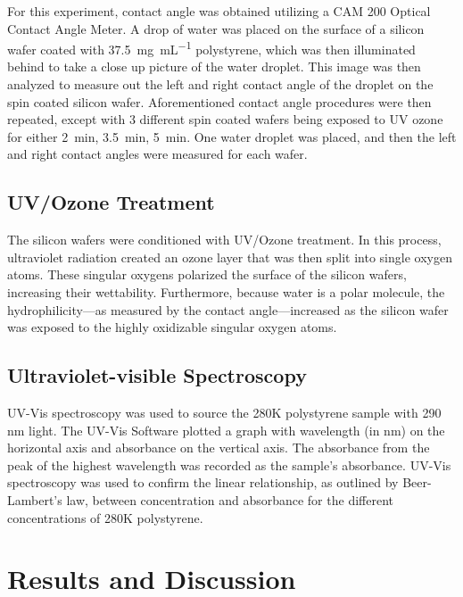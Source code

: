 \documentclass[twocolumn]{article}
\begin{document}
                For this experiment, contact angle was obtained utilizing a CAM 200 Optical Contact Angle Meter. A drop of water was placed on the surface of a silicon wafer coated with \qty{37.5}{\milli\gram\per\milli\liter} polystyrene, which was then illuminated behind to take a close up picture of the water droplet. This image was then analyzed to measure out the left and right contact angle of the droplet on the spin coated silicon wafer. Aforementioned contact angle procedures were then repeated, except with 3 different spin coated wafers being exposed to UV ozone for either \qty{2}{\minute}, \qty{3.5}{\minute}, \qty{5}{\minute}. One water droplet was placed, and then the left and right contact angles were measured for each wafer. 
            
            \subsection{UV/Ozone Treatment}
                The silicon wafers were conditioned with UV/Ozone treatment. In this process, ultraviolet radiation created an ozone layer that was then split into single oxygen atoms. These singular oxygens polarized the surface of the silicon wafers, increasing their wettability. Furthermore, because water is a polar molecule, the hydrophilicity---as measured by the contact angle---increased as the silicon wafer was exposed to the highly oxidizable singular oxygen atoms. 

            \subsection{Ultraviolet-visible Spectroscopy}
                UV-Vis spectroscopy was used to source the 280K polystyrene sample with 290 nm light. The UV-Vis Software plotted a graph with wavelength (in nm) on the horizontal axis and absorbance on the vertical axis. The absorbance from the peak of the highest wavelength was recorded as the sample's absorbance. UV-Vis spectroscopy was used to confirm the linear relationship, as outlined by Beer-Lambert's law, between concentration and absorbance for the different concentrations of 280K polystyrene.

        \section{Results and Discussion}
\end{document}
